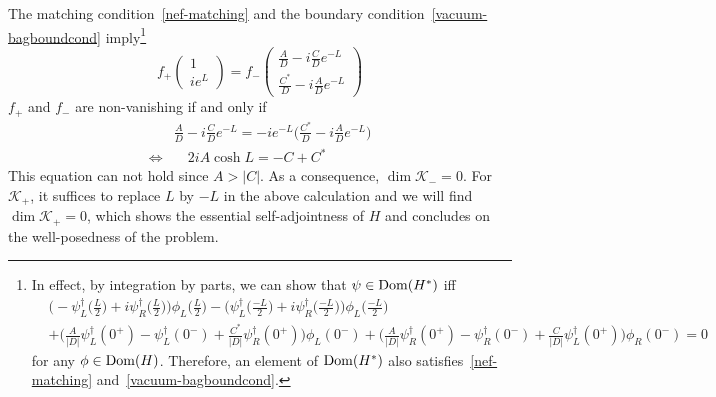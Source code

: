The matching condition~\cref{nef-matching} and the boundary condition~\cref{vacuum-bagboundcond} imply\footnote{
In effect, by integration by parts, we can show that $\psi\in\mathrm{Dom}(H^*)$ iff 
\begin{equation*}\begin{split}
&\Big(-\psi^\dagger_L\big(\frac L 2 \big) + i\psi_R^\dagger\big(\frac L 2\big) \Big)\phi_L\big(\frac L 2\big)
-\Big(\psi^\dagger_L\big(\frac{-L}{ 2} \big) + i\psi_R^\dagger\big(\frac{ -L}{ 2}\big) \Big)\phi_L\big(\frac{ -L}{ 2}\big) \\
&+\Big(\frac{A}{|D|} \psi_L^\dagger(0^+) - \psi_L^\dagger(0^-) + \frac{C^*}{|D|}\psi_R^\dagger(0^+)\Big)\phi_L(0^-) 
+ \Big(\frac{A}{|D|} \psi_R^\dagger(0^+) - \psi_R^\dagger(0^-) + \frac{C}{|D|}\psi_L^\dagger(0^+)\Big)\phi_R(0^-) =0
\end{split}
\end{equation*}
for any $\phi\in\mathrm{Dom}(H)$.
Therefore, an element of $\mathrm{Dom}(H^*)$ also satisfies~\cref{nef-matching} and~\cref{vacuum-bagboundcond}.
}
\begin{equation}
f_+ \begin{pmatrix} 1 \\ ie^L \end{pmatrix}
= f_- \begin{pmatrix} \frac{A}{D} - i\frac{C}{D} e^{-L}  \\
\frac{C^*}{D} - i \frac{A}{D} e^{-L} \end{pmatrix}
\end{equation}
$f_+$ and $f_-$ are non-vanishing if and only if 
\begin{equation}
\begin{split}
& \frac A D - i\frac C D e^{-L} =  -ie^{-L}\big(\frac{ C^*}{ D} -i \frac A D e^{-L}\big) \\
\Leftrightarrow & \quad 2i A \cosh L = -C + C^*
\end{split}
\end{equation}
This equation can not hold since $A > |C|$.
As a consequence, $\dim\mathcal{K}_- = 0$. 
For $\mathcal{K}_+$, it suffices to replace $L$ by $-L$ in the above calculation and we will find $\dim\mathcal{K}_+ = 0$, which shows the essential self-adjointness of $H$ and concludes on the well-posedness of the problem.

















